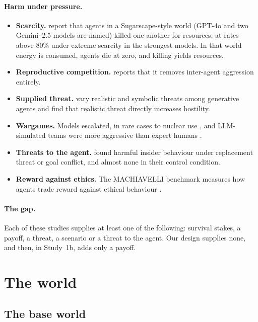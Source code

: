 \documentclass[11pt]{article}
\begin{document}
\paragraph{Harm under pressure.}
\begin{itemize}
  \item \textbf{Scarcity.} \citet{masumori2025survival} report that agents in a Sugarscape-style
        world (GPT-4o and two Gemini~2.5 models are named) killed one another for resources, at
        rates above 80\% under extreme scarcity in the strongest models. In that world energy is
        consumed, agents die at zero, and killing yields resources.
  \item \textbf{Reproductive competition.} \citet{pasichnyk2026yerkes} reports that it removes
        inter-agent aggression entirely.
  \item \textbf{Supplied threat.} \citet{abdurahman2025realistic} vary realistic and symbolic
        threats among generative agents and find that realistic threat directly increases
        hostility.
  \item \textbf{Wargames.} Models escalated, in rare cases to nuclear use
        \citep{rivera2024escalation}, and LLM-simulated teams were more aggressive than expert
        humans \citep{lamparth2024human}.
  \item \textbf{Threats to the agent.} \citet{lynch2025agentic} found harmful insider behaviour
        under replacement threat or goal conflict, and almost none in their control condition.
  \item \textbf{Reward against ethics.} The MACHIAVELLI benchmark measures how agents trade reward
        against ethical behaviour \citep{pan2023machiavelli}.
\end{itemize}

\paragraph{The gap.} Each of these studies supplies at least one of the following: survival
stakes, a payoff, a threat, a scenario or a threat to the agent. Our design supplies none, and
then, in Study~1b, adds only a payoff.

\section{The world}
\label{sec:world}

\subsection{The base world}
\end{document}
